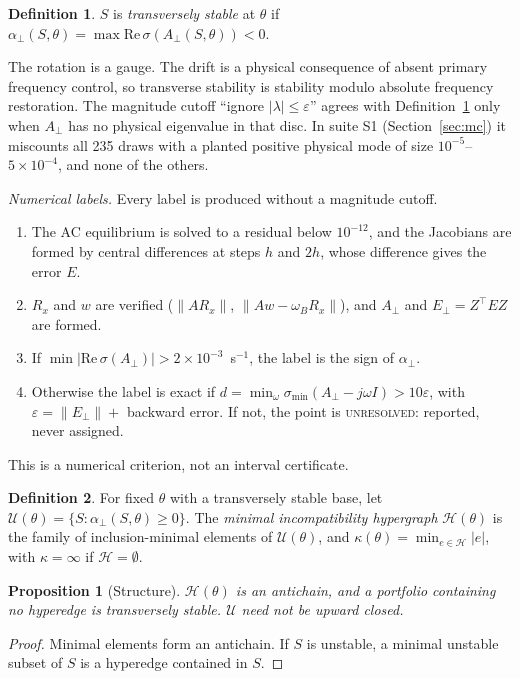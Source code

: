 \documentclass[journal]{IEEEtran}
\newtheorem{proposition}{Proposition}
\theoremstyle{definition}
\newtheorem{definition}{Definition}
\theoremstyle{remark}
\newcommand{\Hy}{\mathcal{H}}
\newcommand{\aperp}{\alpha_{\perp}}
\newcommand{\Aperp}{A_{\perp}}
\begin{document}
\begin{definition}\label{def:stable}
$S$ is \emph{transversely stable} at $\theta$ if
$\aperp(S,\theta)=\max\mathrm{Re}\,\sigma(\Aperp(S,\theta))<0$.
\end{definition}

The rotation is a gauge. The drift is a physical consequence of absent primary
frequency control, so transverse stability is stability modulo absolute
frequency restoration. The magnitude cutoff ``ignore $|\lambda|\le\varepsilon$''
agrees with Definition~\ref{def:stable} only when $\Aperp$ has no physical
eigenvalue in that disc. In suite S1 (Section~\ref{sec:mc}) it miscounts all
235 draws with a planted positive physical mode of size
$10^{-5}$--$5\times10^{-4}$, and none of the others.

\emph{Numerical labels.} Every label is produced without a magnitude cutoff.
\begin{enumerate}
\item The AC equilibrium is solved to a residual below $10^{-12}$, and the
Jacobians are formed by central differences at steps $h$ and $2h$, whose
difference gives the error $E$.
\item $R_x$ and $w$ are verified ($\|AR_x\|$, $\|Aw-\omega_BR_x\|$), and
$\Aperp$ and $E_\perp=Z^\top EZ$ are formed.
\item If $\min|\mathrm{Re}\,\sigma(\Aperp)|>2\times10^{-3}$~s$^{-1}$, the label
is the sign of $\aperp$.
\item Otherwise the label is exact if
$d=\min_\omega\sigma_{\min}(\Aperp-j\omega I)>10\varepsilon$, with
$\varepsilon=\|E_\perp\|+$ backward error. If not, the point is
\textsc{unresolved}: reported, never assigned.
\end{enumerate}
This is a numerical criterion, not an interval certificate.

\begin{definition}\label{def:hyper}
For fixed $\theta$ with a transversely stable base, let
$\mathcal{U}(\theta)=\{S:\aperp(S,\theta)\ge 0\}$. The \emph{minimal
incompatibility hypergraph} $\Hy(\theta)$ is the family of inclusion-minimal
elements of $\mathcal{U}(\theta)$, and $\kappa(\theta)=\min_{e\in\Hy}|e|$, with
$\kappa=\infty$ if $\Hy=\emptyset$.
\end{definition}

\begin{proposition}[Structure]\label{prop:structure}
$\Hy(\theta)$ is an antichain, and a portfolio containing no hyperedge is
transversely stable. $\mathcal{U}$ need not be upward closed.
\end{proposition}
\begin{proof}
Minimal elements form an antichain. If $S$ is unstable, a minimal unstable
subset of $S$ is a hyperedge contained in $S$.
\end{proof}
\end{document}
